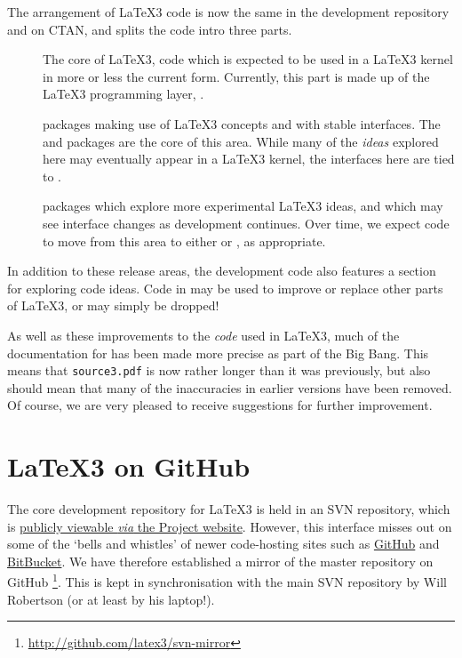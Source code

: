 \documentclass{ltnews}
\begin{document}
The arrangement of \LaTeX3 code is now the same in the development
repository and on CTAN, and splits the code intro three parts.
\begin{description}
  \item[] The core of \LaTeX3, code which
    is expected to be used in a \LaTeX3 kernel in more or less the
    current form. Currently, this part is made up of the \LaTeX3
    programming layer, .
  \item[] \LaTeXe{} packages making use of \LaTeX3
    concepts and with stable interfaces. The  and
     packages are the core of this area. While many of
    the \emph{ideas} explored here may eventually appear in a \LaTeX3
    kernel, the interfaces here are tied to \LaTeXe{}.
  \item[] \LaTeXe{} packages which explore more
    experimental \LaTeX3 ideas, and which may see interface changes as
    development continues. Over time, we expect code to move from this area
    to either  or , as appropriate.
\end{description}

In addition to these release areas, the development code also features a
 section for exploring code ideas. Code in  may be
used to improve or replace other parts of \LaTeX3, or may simply be dropped!

As well as these improvements to the \emph{code} used in \LaTeX3, much of the
documentation for  has been made more precise as part of the Big
Bang. This means that \texttt{source3.pdf} is now rather longer than it was
previously, but also should mean that many of the inaccuracies in earlier
versions have been removed. Of course, we are very pleased to receive
suggestions for further improvement.

\section{\LaTeX3 on GitHub}

The core development repository for \LaTeX3 is held in an SVN repository, which
is \href{http://www.latex-project.org/code.html}{publicly viewable \emph{via}
the Project website}. However, this interface misses out on some of the `bells
and whistles' of newer code-hosting sites such as
\href{http://gitbug.com/}{GitHub} and \href{http://bitbucket.org/}{BitBucket}.
We have therefore established a mirror of the master repository on GitHub%
\footnote{\url{http://github.com/latex3/svn-mirror}}. This is kept in
synchronisation with the main SVN repository by Will Robertson (or at least
by his laptop!).
\end{document}

